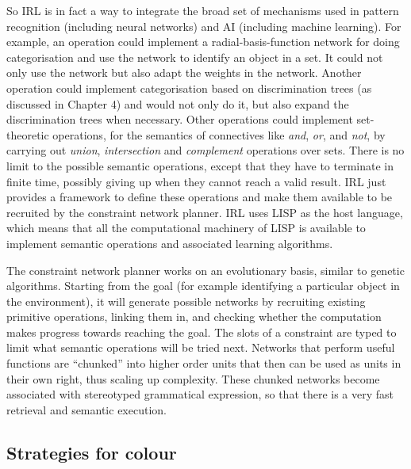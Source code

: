 So IRL is in fact a way to integrate the broad set of mechanisms used in 
pattern recognition (including neural networks) and AI (including machine learning). 
For example, an operation could implement a radial-basis-function network for doing categorisation and 
use the network to identify an object in a set. It could not only use the network but also adapt 
the weights in the network. Another operation could implement categorisation based 
on discrimination trees (as discussed in Chapter 4) and would not only do it, but also expand the discrimination trees 
when necessary. Other operations could implement set-theoretic operations, 
for the semantics of connectives like {\itshape and}, {\itshape or}, and {\itshape not}, by carrying out
{\itshape union}, {\itshape intersection} and {\itshape complement} operations over sets. There is no 
limit to the possible semantic operations, except that they have to terminate in finite time, possibly giving up when 
they cannot reach a valid result. IRL just provides a framework to define these operations and make them available 
to be recruited by the constraint network planner. IRL uses LISP as the host language, which means that all 
the computational machinery of LISP is available to implement semantic operations and associated learning algorithms. 

The constraint network planner works on an evolutionary basis, similar to genetic algorithms. Starting from the goal 
(for example identifying a particular object in the environment), it will generate possible networks by recruiting 
existing primitive operations, linking them in, and checking whether the computation makes progress towards reaching the goal. 
The slots of a constraint are typed to limit what semantic operations will be tried next. Networks that perform useful 
functions are ``chunked'' into higher order units that then can be used as units in their own right, thus scaling up 
complexity. These chunked networks become associated with stereotyped grammatical expression, so that there is a very 
fast retrieval and semantic execution.
\subsection{Strategies for colour}

